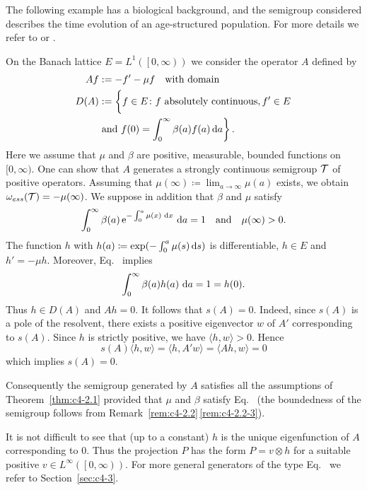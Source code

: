 The following example has a biological background, and the semigroup considered describes the time evolution of an age-structured population.
For more details we refer to \textcite{greiner:1984a} or \textcite{webb:1984}.
\begin{example}\label{ex:c4-2.3}
On the Banach lattice $E = L^{1}( \left[0,\infty\right))$ we consider the operator $A$ defined by
\begin{equation}\label{eq:c4-2.2}
\begin{split}
	Af &:= -f' - \mu f \quad \text{with domain}\\ 
	D(A) &:= \left\{ \vphantom{\int_{0}^{\infty}}f \in E \colon f \text{ absolutely continuous}, f' \in E  \right. \\
	 \qquad & \left. \text{and } f(0) = \int_{0}^{\infty} \beta(a) f(a)  \diff{a} \vphantom{\}} \right\}.
\end{split}
\end{equation}
Here we assume that $\mu$ and $\beta$ are positive, measurable, bounded functions on $[0,\infty)$.
One can show that $A$ generates a strongly continuous semigroup $\mathcal{T}$ of positive operators.
Assuming that $\mu(\infty) \coloneqq \lim_{a \to \infty}\mu(a)$ exists, we obtain $\omega_{ess}(\mathcal{T}) = -\mu(\infty)$.
We suppose in addition that $\beta$ and $\mu$ satisfy
\begin{equation}\label{eq:c4-2.3}
\int_{0}^{\infty} \beta(a)\,\mathrm{e}^{-\int_{0}^{a} \mu(x)\,\mathop{}\!\mathrm{d}{x}}\,\mathop{}\!\mathrm{d}{a} = 1
\quad \text{and} \quad \mu(\infty) > 0.
\end{equation}
The function $h$ with $h(a) \coloneqq \exp(-\int_{0}^{a} \mu(s) \mathop{}\!\mathrm{d}{s})$ is differentiable, $h \in E$ and $h' = -\mu h$.
Moreover, Eq.~ implies 
%
\[
	 \int_{0}^{\infty} \beta(a)h(a) \, \mathop{}\!\mathrm{d}{a} = 1 = h(0) .
\]
%
Thus $h \in D(A)$ and $Ah = 0$.
It follows that $s(A) = 0$.
Indeed, since $s(A)$ is a pole of the resolvent, there exists a positive eigenvector $w$ of\/ $A'$ corresponding to $s(A)$.
Since $h$ is strictly positive, we have $\langle h,w \rangle > 0$. 
Hence 
\[
s(A)\langle h,w \rangle = \langle h,A'w \rangle = \langle Ah,w \rangle = 0
\]
which implies $s(A) = 0$.

Consequently the semigroup generated by $A$ satisfies all the assumptions of Theorem~\ref{thm:c4-2.1} provided that $\mu$ and $\beta$ satisfy Eq.~ (the boundedness of the semigroup follows from Remark~\ref{rem:c4-2.2}\,\ref{rem:c4-2.2-3}).

It is not difficult to see that (up to a constant) $h$ is the unique eigenfunction of\/ $A$ corresponding to $0$.
Thus the projection $P$ has the form $P = v \otimes h$ for a suitable positive $v \in L^{\infty}(\left[0,\infty\right))$.
For more general generators of the type Eq.~ we refer to Section~\ref{sec:c4-3}.
\end{example}

